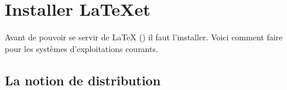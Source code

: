 \chapter{Installer \LaTeX et \XeLaTeX}

\begin{prealable}
	Avant de pouvoir se servir de \LaTeX{} (\XeLaTeX) il faut l'installer. Voici comment faire pour les systèmes d'exploitations courants.
\end{prealable}

\section{La notion de distribution}


